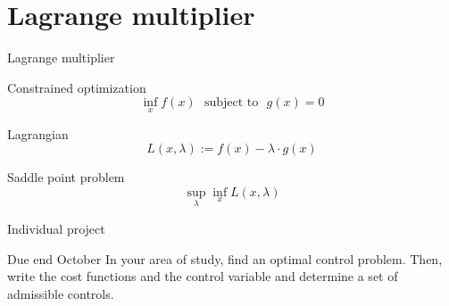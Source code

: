 \documentclass[color=usenames,dvipsnames]{beamer}
\begin{document}
\section{Lagrange multiplier}
\begin{frame}{Lagrange multiplier}
    \begin{block}
        {Constrained optimization}
        \[
        \inf_x f(x) ~~~ \textrm{subject to}~~~g(x)=0
        \]
    \end{block}
    \begin{block}
        {Lagrangian}
        \[
        L(x,\lambda):= f(x) - \lambda \cdot g(x)
        \]
    \end{block}
    \begin{blcok}
        {Saddle point problem}
        \[
        \sup_{\lambda}\inf_{x}L(x,\lambda)
        \]
    \end{blcok}
\end{frame}

\begin{frame}{Individual project}
\begin{block}{Due end October}
     In your area of study, find an optimal control problem. Then, write the cost functions and the control variable and determine a set of admissible controls. 
\end{block}
\end{frame}
\end{document}
